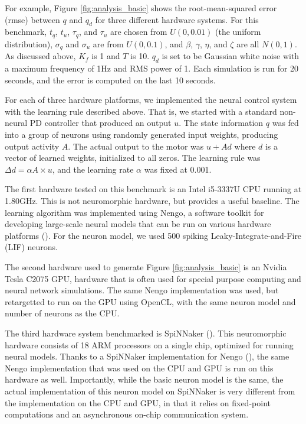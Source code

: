 \documentclass{frontiersSCNS} %
\begin{document}
For example, Figure \ref{fig:analysis_basic} shows the root-mean-squared
error (rmse) between $q$ and $q_d$ for three different hardware systems.  For
this benchmark, $t_q$, $t_u$, $\tau_q$, and $\tau_u$ are chosen from $U(0, 0.01)$ (the uniform distribution), $\sigma_q$ and $\sigma_u$ are from $U(0, 0.1)$,
and $\beta$, $\gamma$, $\eta$, and $\zeta$ are all $N(0, 1)$.  As discussed
above, $K_f$ is 1 and $T$ is 10.  $q_d$ is set to be Gaussian white noise with
a maximum frequency of 1Hz and RMS power of 1.  Each simulation is run
for 20 seconds, and the error is computed on the last 10 seconds.

For each of three hardware platforms, we implemented the neural control
system with the learning rule described above.  That is, we started with a
standard non-neural PD controller that produced an output $u$.  The state
information $q$ was fed into a group of neurons using randomly generated
input weights, producing output activity $A$.  The actual output to the motor
was $u+Ad$ where $d$ is a vector of learned weights, initialized to all
zeros.  The learning rule was $\Delta d=\alpha A \times u$, and the
learning rate $\alpha$ was fixed at 0.001.  

The first hardware tested on this benchmark is an Intel i5-3337U CPU running
at 1.80GHz.  This is not neuromorphic hardware, but provides a
useful baseline.  The learning algorithm was implemented using Nengo,
a software toolkit for developing large-scale neural models that can be run
on various hardware platforms (\citealt{nengo}).  For the neuron model, we used
500 spiking Leaky-Integrate-and-Fire (LIF) neurons.

The second hardware used to generate Figure \ref{fig:analysis_basic} is an
Nvidia Tesla C2075 GPU, hardware that is often used for special purpose computing
and neural network simulations.  The same Nengo implementation was used, but
retargetted to run on the GPU using OpenCL, with the same neuron model and
number of neurons as the CPU.

The third hardware system benchmarked is SpiNNaker (\citealt{furber2014}).  This
neuromorphic hardware consists of 18 ARM processors on a single chip, 
optimized for running neural models.  Thanks to a SpiNNaker implementation
for Nengo (\citealt{mundy2015}), the same Nengo implementation that was used on the
CPU and GPU is run on this hardware as well.  Importantly, while the
basic neuron model is the same, the actual implementation of this neuron model on
SpiNNaker is very different from the implementation on the CPU and GPU, in
that it relies on fixed-point computations and an asynchronous on-chip
communication system.
\end{document}
